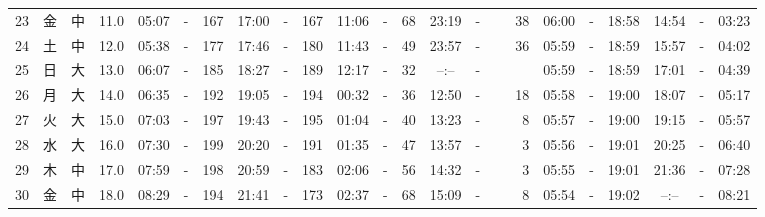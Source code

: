 \documentclass[12pt,a4j]{jsarticle}
\begin{document}
\begin{table}[htbp]
\begin{center}
{\begin{tabular}{|rc|cr|ccrccr|ccrccr|ccc|ccc|}
23 & 金 & 中 & 11.0 &  05:07 &-& 167 &  17:00 &-& 167 &  11:06 &-&  68 &  23:19 &-&  38 & 06:00 & -& 18:58 & 14:54 & -& 03:23 \\
24 & 土 & 中 & 12.0 &  05:38 &-& 177 &  17:46 &-& 180 &  11:43 &-&  49 &  23:57 &-&  36 & 05:59 & -& 18:59 & 15:57 & -& 04:02 \\
25 & 日 & 大 & 13.0 &  06:07 &-& 185 &  18:27 &-& 189 &  12:17 &-&  32 &  --:-- &-&~~~~~ & 05:59 & -& 18:59 & 17:01 & -& 04:39 \\
26 & 月 & 大 & 14.0 &  06:35 &-& 192 &  19:05 &-& 194 &  00:32 &-&  36 &  12:50 &-&  18 & 05:58 & -& 19:00 & 18:07 & -& 05:17 \\
27 & 火 & 大 & 15.0 &  07:03 &-& 197 &  19:43 &-& 195 &  01:04 &-&  40 &  13:23 &-&   8 & 05:57 & -& 19:00 & 19:15 & -& 05:57 \\
28 & 水 & 大 & 16.0 &  07:30 &-& 199 &  20:20 &-& 191 &  01:35 &-&  47 &  13:57 &-&   3 & 05:56 & -& 19:01 & 20:25 & -& 06:40 \\
29 & 木 & 中 & 17.0 &  07:59 &-& 198 &  20:59 &-& 183 &  02:06 &-&  56 &  14:32 &-&   3 & 05:55 & -& 19:01 & 21:36 & -& 07:28 \\
30 & 金 & 中 & 18.0 &  08:29 &-& 194 &  21:41 &-& 173 &  02:37 &-&  68 &  15:09 &-&   8 & 05:54 & -& 19:02 & --:-- & -& 08:21 \\
   \hline
   \end{tabular}}
   \end{center}
\end{table}
\newpage
\end{document}
